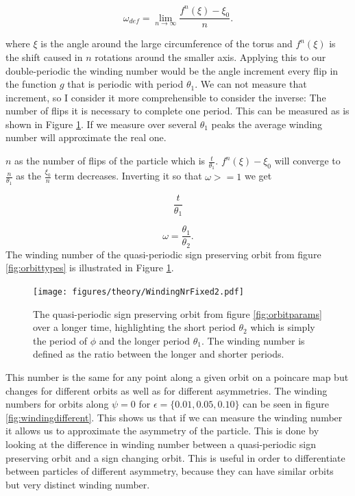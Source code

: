 \begin{equation}
\omega_{def}  = \lim\limits_{n \rightarrow \infty} \frac{f^n(\xi) - \xi_0}{n}.
\end{equation}

where $\xi$ is the angle around the large circumference of the torus and $f^n(\xi)$ is the shift caused in $n$ rotations around the smaller axis. 
Applying this to our double-periodic the winding number would be the angle increment every flip in the function $g$ that is periodic with period 
$\theta_1$. We can not measure that increment, so I consider it more comprehensible to consider the inverse: The number of flips it is necessary to 
complete one period. This can be measured as is shown in Figure \ref{fig:windingDef}. If we measure over several $\theta_1$ peaks the average winding 
number will approximate the real one. 


$n$ as the number of flips of the particle which is $\frac{t}{\theta_1}$. $f^n(\xi) - \xi_0$ will converge to $\frac{n}{\theta_1}$ as the
 $\frac{\xi_0}{n}$ term decreases. Inverting it so that $\omega >= 1$ we get

\begin{equation}
\frac{t}{\theta_1}	
\end{equation}

\begin{equation}\label{eq:winding}
\omega = \frac{\theta_1}{\theta_2}.
\end{equation}
%
\noindent The winding number of the quasi-periodic sign preserving orbit from figure \ref{fig:orbittypes} is illustrated in Figure \ref{fig:windingDef}.

\begin{figure}[H]
\begin{center}
\texttt{[image: figures/theory/WindingNrFixed2.pdf]}
\end{center}
\caption{The quasi-periodic sign preserving orbit from figure \ref{fig:orbitparams} over a longer time, highlighting the short period $\theta_2$ which is simply the period of $\phi$ and the longer period $\theta_1$. The winding number is defined as the ratio between the longer and shorter periods.}
\label{fig:windingDef}
\end{figure}

This number is the same for any point along a given orbit on a poincare map but changes for different orbits as well as for different asymmetries. The winding numbers for orbits along $\psi=0$ for $\epsilon=\{0.01, 0.05, 0.10\}$ can be seen in figure \ref{fig:windingdifferent}. This shows us that if we can measure the winding number it allows us to approximate the asymmetry of the particle.  This is done by looking at the difference in winding number between a quasi-periodic sign preserving orbit and a sign changing orbit. This is useful in order to differentiate between particles of different asymmetry, because they can have similar orbits but very distinct winding number. 
 
